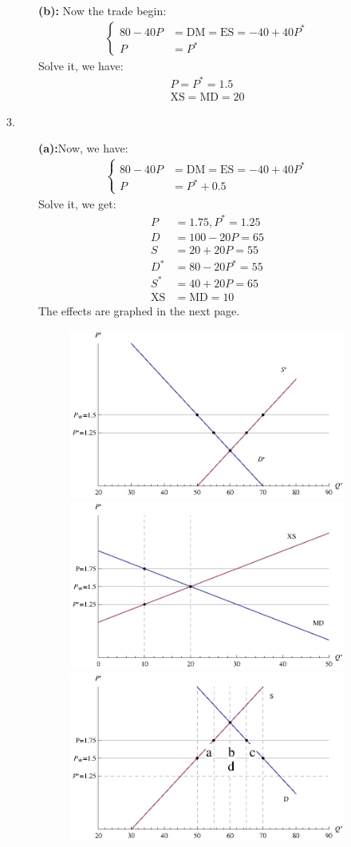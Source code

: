 \documentclass{article}
\begin{document}
\begin{description}
\begin{description}
\begin{center}
      \end{center}
      {\bf (b):}
      Now the trade begin:
      \begin{align}
        \begin{cases}
         80-40P&=\text{DM}=\text{ES}=-40+40P^* \\
         P&=P^*
        \end{cases}
      \end{align}
      Solve it, we have:
      \begin{align}
         P=P^*=1.5\\
         \text{XS}=\text{MD}=20
      \end{align}
    \item[3.]
      {\bf (a):}Now, we have:
      \begin{align}
        \begin{cases}
            80-40P&=\text{DM}=\text{ES}=-40+40P^* \\
            P&=P^*+0.5
        \end{cases}
      \end{align}
      Solve it, we get: \begin{align}
        P&=1.75, P^*=1.25\\
        D&=100-20P=65\\
        S&=20+20P=55\\
        D^*&=80-20P^*=55\\
        S^*&=40+20P=65\\
        \text{XS}&=\text{MD}=10
        \end{align}
        The effects are graphed in the next page.
        \begin{figure}[H]\centering
        \includegraphics[angle=90,width=.3\textwidth]{ECON3610BA4P5}\\
        \includegraphics[angle=90,width=.3\textwidth]{ECON3610BA4P4}\\
        \includegraphics[angle=90,width=.3\textwidth]{ECON3610BA4P3}\\

\end{figure}
\end{description}
\end{description}
\end{document}

